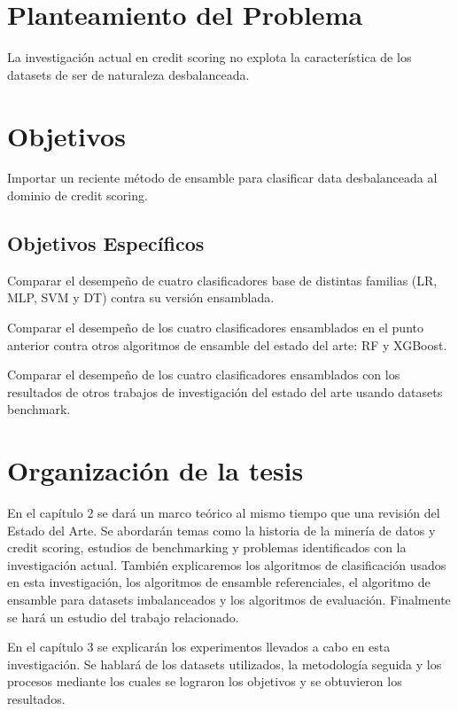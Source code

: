 \section{Planteamiento del Problema}

La investigación actual en credit scoring no explota la característica de los datasets de ser de naturaleza desbalanceada.

\section{Objetivos}

Importar un reciente método de ensamble para clasificar data desbalanceada al dominio de credit scoring.

\subsection{Objetivos Específicos}

Comparar el desempeño de cuatro clasificadores base de distintas familias (\ac{LR}, \ac{MLP}, \ac{SVM} y \ac{DT}) contra su versión ensamblada.

Comparar el desempeño de los cuatro clasificadores ensamblados en el punto anterior contra otros algoritmos de ensamble del estado del arte: \ac{RF} y \ac{XGBoost}.

Comparar el desempeño de los cuatro clasificadores ensamblados con los resultados de otros trabajos de investigación del estado del arte usando datasets benchmark.

\section{Organización de la tesis}

En el capítulo 2 se dará un marco teórico al mismo tiempo que una revisión del Estado del Arte. Se abordarán temas como la historia de la minería de datos y credit scoring, estudios de benchmarking y problemas identificados con la investigación actual. También explicaremos los algoritmos de clasificación usados en esta investigación, los algoritmos de ensamble referenciales, el algoritmo de ensamble para datasets imbalanceados y los algoritmos de evaluación. Finalmente se hará un estudio del trabajo relacionado.

En el capítulo 3 se explicarán los experimentos llevados a cabo en esta investigación. Se hablará de los datasets utilizados, la metodología seguida y los procesos mediante los cuales se lograron los objetivos y se obtuvieron los resultados.

